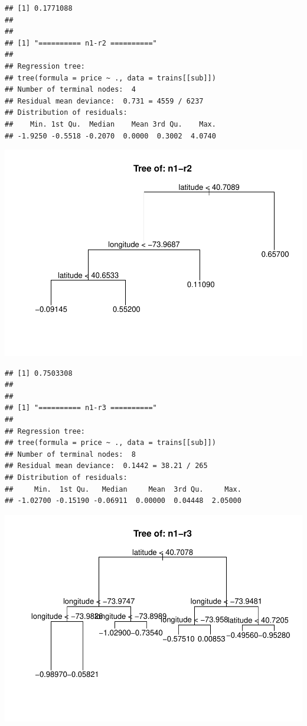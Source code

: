 \documentclass[
]{article}
\begin{document}
\begin{verbatim}
## [1] 0.1771088
## 
## 
## [1] "========== n1-r2 =========="
## 
## Regression tree:
## tree(formula = price ~ ., data = trains[[sub]])
## Number of terminal nodes:  4 
## Residual mean deviance:  0.731 = 4559 / 6237 
## Distribution of residuals:
##    Min. 1st Qu.  Median    Mean 3rd Qu.    Max. 
## -1.9250 -0.5518 -0.2070  0.0000  0.3002  4.0740
\end{verbatim}

\includegraphics{project-code_files/figure-latex/unnamed-chunk-14-7.pdf}

\begin{verbatim}
## [1] 0.7503308
## 
## 
## [1] "========== n1-r3 =========="
## 
## Regression tree:
## tree(formula = price ~ ., data = trains[[sub]])
## Number of terminal nodes:  8 
## Residual mean deviance:  0.1442 = 38.21 / 265 
## Distribution of residuals:
##     Min.  1st Qu.   Median     Mean  3rd Qu.     Max. 
## -1.02700 -0.15190 -0.06911  0.00000  0.04448  2.05000
\end{verbatim}

\includegraphics{project-code_files/figure-latex/unnamed-chunk-14-8.pdf}
\end{document}
